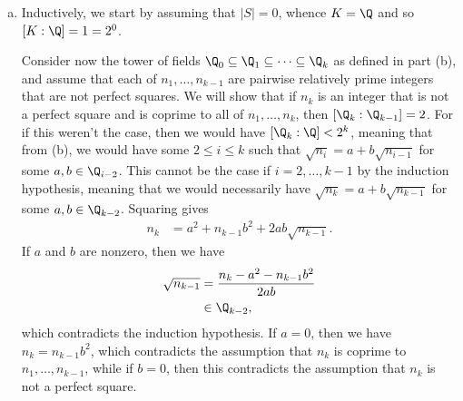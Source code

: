 \documentclass[10pt]{mypackage}
\begin{document}
\begin{solution}
\begin{enumerate}[(a)]
      Now, if $\left[ K:\Q \right] < 2^{k}$, then we write
      \begin{align*}
        \left[ K:\Q \right] &= \left[ \Q_k:\Q_{k-1} \right]\cdots \left[ \Q_1:\Q \right],
      \end{align*}
      and observe that each degree value is either $1$ or $2$. Since $\left[ K:\Q \right] < 2^{k}$, it follows that there is at least one factor that is equal to $1$. If $\left[ \Q_1:\Q \right] = 1$, then we have that $\sqrt{n_1}\in \Q$, meaning that $n_1$ is a perfect square. Otherwise, if there is some $i$ such that $\left[ \Q_i:\Q_{i-1} \right] = 1$, then since $\Q_{i-1} = \Q_{i-2}\left( \sqrt{n_{i-1}} \right)$, it follows that $\sqrt{n_i}\in \Q_{i-2}\left( \sqrt{n_{i-1}} \right)$, whence there are some $a,b\in \Q_{i-2}$ such that $\sqrt{n_i} = a + b\sqrt{n_{i-1}}$.
    \item Inductively, we start by assuming that $\left\vert S \right\vert = 0$, whence $K = \Q$ and so $\left[ K:\Q \right] = 1 = 2^{0}$.

      Consider now the tower of fields $\Q_0\subseteq \Q_1\subseteq\cdots\subseteq \Q_k$ as defined in part (b), and assume that each of $n_1,\dots,n_{k-1}$ are pairwise relatively prime integers that are not perfect squares. We will show that if $n_k$ is an integer that is not a perfect square and is coprime to all of $n_1,\dots,n_k$, then $\left[ \Q_k:\Q_{k-1} \right] = 2$. For if this weren't the case, then we would have $\left[ \Q_k:\Q \right] < 2^{k}$, meaning that from (b), we would have some $2\leq i \leq k$ such that $\sqrt{n_i} = a + b\sqrt{n_{i-1}}$ for some $a,b\in \Q_{i-2}$. This cannot be the case if $i = 2,\dots,k-1$ by the induction hypothesis, meaning that we would necessarily have $\sqrt{n_k} = a + b\sqrt{n_{k-1}}$ for some $a,b\in \Q_{k-2}$. Squaring gives
      \begin{align*}
        n_k &= a^2 + n_{k-1}b^2 + 2ab\sqrt{n_{k-1}}.
      \end{align*}
      If $a$ and $b$ are nonzero, then we have
      \begin{align*}
        \sqrt{n_{k-1}} &= \frac{n_k - a^2 - n_{k-1}b^2}{2ab}\\
                       &\in \Q_{k-2},
      \end{align*}
      which contradicts the induction hypothesis. If $a = 0$, then we have $n_k = n_{k-1}b^2$, which contradicts the assumption that $n_k$ is coprime to $n_1,\dots,n_{k-1}$, while if $b = 0$, then this contradicts the assumption that $n_k$ is not a perfect square.
  \end{enumerate}
\end{solution}
\end{document}
